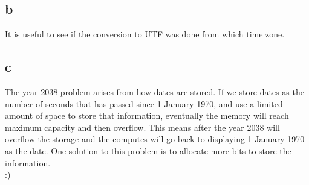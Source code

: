 \documentclass{article}
\begin{document}
    \subsection{b}
    It is useful to see if the conversion to UTF was done from which time zone.\\
    \subsection{c}
    The year 2038 problem arises from how dates are stored.
    If we store dates as the number of seconds that has passed since 1 January 1970,
    and use a limited amount of space to store that information, eventually the 
    memory will reach maximum capacity and then overflow. This means after the year 2038
    will overflow the storage and the computes will go back to displaying 1 January 1970 as the date.
    One solution to this problem is to allocate more bits to store the information.\\
    :)
\end{document}
